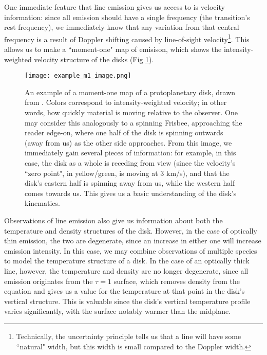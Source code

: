 One immediate feature that line emission gives us access to is velocity information: since all emission should have a single frequency (the transition's rest frequency), we immediately know that any variation from that central frequency is a result of Doppler shifting caused by line-of-sight velocity\footnote{Technically, the uncertainty principle tells us that a line will have some ``natural" width, but this width is small compared to the Doppler width.}. This allows us to make a ``moment-one" map of emisison, which shows the intensity-weighted velocity structure of the disks (Fig \ref{fig:ex_mom1}).


\begin{figure} %
\centering
  \texttt{[image: example\_m1\_image.png]}
  \caption{An example of a moment-one map of a protoplanetary disk, drawn from \citet{Rosenfeld2012}. Colors correspond to intensity-weighted velocity; in other words, how quickly material is moving relative to the observer. One may consider this analogously to a spinning Frisbee, approaching the reader edge-on, where one half of the disk is spinning outwards (away from us) as the other side approaches. From this image, we immediately gain several pieces of information: for example, in this case, the disk as a whole is receding from view (since the velocity's ``zero point", in yellow/green, is moving at 3 km/s), and that the disk's eastern half is spinning away from us, while the western half comes towards us. This gives us a basic understanding of the disk's kinematics.}
  \label{fig:ex_mom1}
\end{figure}


Observations of line emission also give us information about both the temperature and density structures of the disk. However, in the case of optically thin emission, the two are degenerate, since an increase in either one will increase emission intensity. In this case, we may combine observations of multiple species to model the temperature structure of a disk. In the case of an optically thick line, however, the temperature and density are no longer degenerate, since all emission originates from the $\tau=1$ surface, which removes density from the equation and gives us a value for the temperature at that point in the disk's vertical structure. This is valuable since the disk's vertical temperature profile varies significantly, with the surface notably warmer than the midplane.

